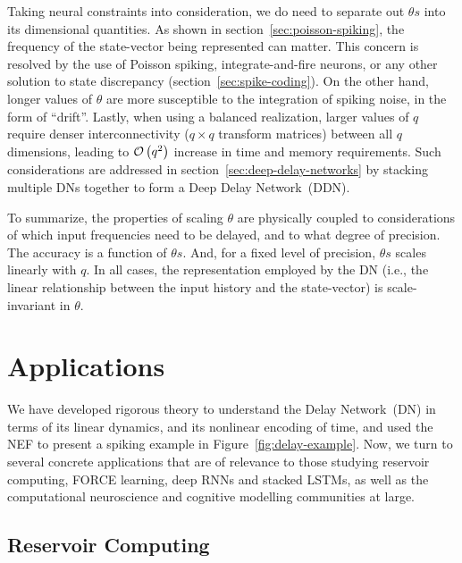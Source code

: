 Taking neural constraints into consideration, we do need to separate out $\theta s$ into its dimensional quantities.
As shown in section~\ref{sec:poisson-spiking}, the frequency of the state-vector being represented can matter.
This concern is resolved by the use of Poisson spiking, integrate-and-fire neurons, or any other solution to state discrepancy (section~\ref{sec:spike-coding}).
On the other hand, longer values of $\theta$ are more susceptible to the integration of spiking noise, in the form of ``drift''.
Lastly, when using a balanced realization, larger values of $q$ require denser interconnectivity ($q \times q$ transform matrices) between all $q$ dimensions, leading to $\mathcal{O}\left({q^2}\right)$ increase in time and memory requirements.
Such considerations are addressed in section~\ref{sec:deep-delay-networks} by stacking multiple DNs together to form a Deep Delay Network~(DDN).

To summarize, the properties of scaling $\theta$ are physically coupled to considerations of which input frequencies need to be delayed, and to what degree of precision.
The accuracy is a function of $\theta s$.
And, for a fixed level of precision, $\theta s$ scales linearly with $q$.
In all cases, the representation employed by the DN (i.e., the linear relationship between the input history and the state-vector) is scale-invariant in $\theta$.

\section{Applications}
\label{sec:delay-applications}

We have developed rigorous theory to understand the Delay Network~(DN) in terms of its linear dynamics, and its nonlinear encoding of time, and used the NEF to present a spiking example in Figure~\ref{fig:delay-example}.
Now, we turn to several concrete applications that are of relevance to those studying reservoir computing, FORCE learning, deep RNNs and stacked LSTMs, as well as the computational neuroscience and cognitive modelling communities at large.

\subsection{Reservoir Computing}
\label{sec:delay-rc}

